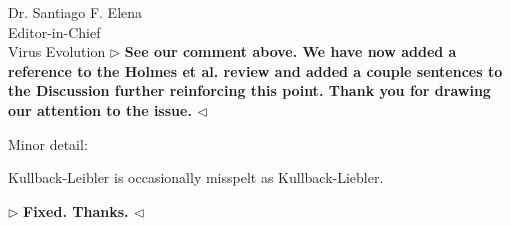 \documentclass[12pt, a4paper]{letter} %
\newenvironment{reply}{$\triangleright$\bf}{$\triangleleft$}
\begin{document}
\begin{letter}{
	Dr. Santiago F. Elena\\
    Editor-in-Chief \\
    Virus Evolution
}
\begin{reply}
See our comment above.
We have now added a reference to the Holmes et al. review and added a couple sentences to the Discussion further reinforcing this point.
Thank you for drawing our attention to the issue.
\end{reply}

Minor detail:

Kullback-Leibler is occasionally misspelt as Kullback-Liebler.

\begin{reply}
Fixed. Thanks.
\end{reply}

\clearpage



\end{letter}
\end{document}

